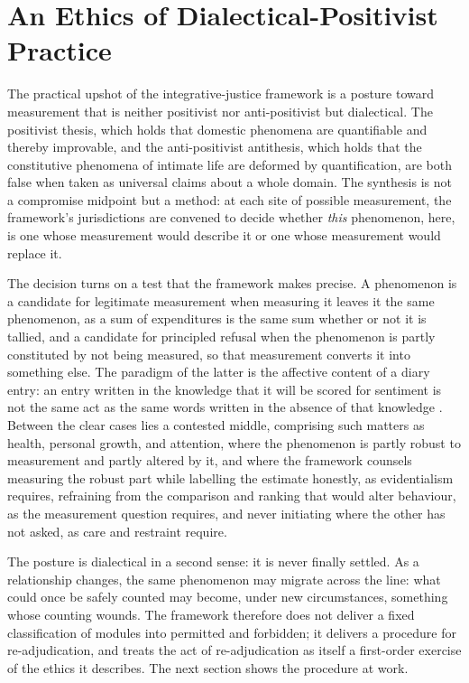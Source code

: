 \section{An Ethics of Dialectical-Positivist Practice}\label{p01:sec:dialectic}

The practical upshot of the integrative-justice framework is a posture toward measurement that is neither positivist nor anti-positivist but dialectical. The positivist thesis, which holds that domestic phenomena are quantifiable and thereby improvable, and the anti-positivist antithesis, which holds that the constitutive phenomena of intimate life are deformed by quantification, are both false when taken as universal claims about a whole domain. The synthesis is not a compromise midpoint but a method: at each site of possible measurement, the framework's jurisdictions are convened to decide whether \emph{this} phenomenon, here, is one whose measurement would describe it or one whose measurement would replace it.

The decision turns on a test that the framework makes precise. A phenomenon is a candidate for legitimate measurement when measuring it leaves it the same phenomenon, as a sum of expenditures is the same sum whether or not it is tallied, and a candidate for principled refusal when the phenomenon is partly constituted by not being measured, so that measurement converts it into something else. The paradigm of the latter is the affective content of a diary entry: an entry written in the knowledge that it will be scored for sentiment is not the same act as the same words written in the absence of that knowledge \parencite{howell2018emotional, boehner2007how}. Between the clear cases lies a contested middle, comprising such matters as health, personal growth, and attention, where the phenomenon is partly robust to measurement and partly altered by it, and where the framework counsels measuring the robust part while labelling the estimate honestly, as evidentialism requires, refraining from the comparison and ranking that would alter behaviour, as the measurement question requires, and never initiating where the other has not asked, as care and restraint require.

The posture is dialectical in a second sense: it is never finally settled. As a relationship changes, the same phenomenon may migrate across the line: what could once be safely counted may become, under new circumstances, something whose counting wounds. The framework therefore does not deliver a fixed classification of modules into permitted and forbidden; it delivers a procedure for re-adjudication, and treats the act of re-adjudication as itself a first-order exercise of the ethics it describes. The next section shows the procedure at work.

